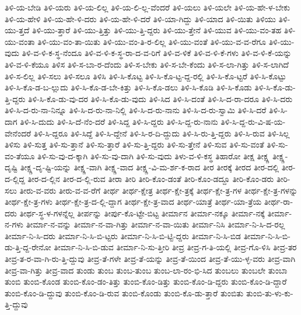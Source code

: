 {ತಿಳಿ-ಯ-ಬೇಡಿ
ತಿಳಿ-ಯರು
ತಿಳಿ-ಯ-ಲಿಲ್ಲ
ತಿಳಿ-ಯ-ಲಿ-ಲ್ಲ-ವೆಂದರೆ
ತಿಳಿ-ಯಲು
ತಿಳಿ-ಯಲೇ
ತಿಳಿ-ಯ-ಹೇ-ಳ-ಬೇಕು
ತಿಳಿ-ಯ-ಹೇಳಿ
ತಿಳಿ-ಯ-ಹೇ-ಳಿ-ದರು
ತಿಳಿ-ಯ-ಹೇ-ಳಿ-ದರೆ
ತಿಳಿ-ಯಾ-ಗಿದ್ದು
ತಿಳಿ-ಯಾದ
ತಿಳಿ-ಯಿತು
ತಿಳಿಯು
ತಿಳಿ-ಯು-ತ್ತದೆ
ತಿಳಿ-ಯು-ತ್ತಾರೆ
ತಿಳಿ-ಯು-ತ್ತಿತ್ತು
ತಿಳಿ-ಯು-ತ್ತಿ-ದ್ದರು
ತಿಳಿ-ಯು-ತ್ತೇನೆ
ತಿಳಿ-ಯುವ
ತಿಳಿ-ಯು-ವಂ-ತಹ
ತಿಳಿ-ಯು-ವಂತಾ
ತಿಳಿ-ಯು-ವಂ-ತಾ-ಯಿತು
ತಿಳಿ-ಯು-ವಂ-ತಿ-ರ-ಲಿಲ್ಲ
ತಿಳಿ-ಯು-ವಂತೆ
ತಿಳಿ-ಯು-ವ-ವ-ರೆಗೂ
ತಿಳಿ-ಯು-ವುದು
ತಿಳಿ-ವ-ಳಿ-ಕ-ಸ್ಥ-ನೆಂದೂ
ತಿಳಿ-ವ-ಳಿ-ಕ-ಸ್ಥ-ರಾ-ದ-ವ-ರಿಗೆ
ತಿಳಿ-ವ-ಳಿಕೆ
ತಿಳಿ-ವ-ಳಿ-ಕೆ-ಗಳು
ತಿಳಿ-ವ-ಳಿ-ಕೆ-ಯನ್ನು
ತಿಳಿ-ವ-ಳಿ-ಕೆಯೂ
ತಿಳಿಸ
ತಿಳಿ-ಸ-ಬಾ-ರ-ದೆಂದು
ತಿಳಿ-ಸ-ಬೇಕು
ತಿಳಿ-ಸ-ಬೇ-ಕೆಂದು
ತಿಳಿ-ಸ-ಲಾ-ಗಿತ್ತು
ತಿಳಿ-ಸ-ಲಾಗಿದೆ
ತಿಳಿ-ಸ-ಲಿಲ್ಲ
ತಿಳಿ-ಸಲು
ತಿಳಿ-ಸಲೂ
ತಿಳಿಸಿ
ತಿಳಿ-ಸಿ-ಕೊಟ್ಟ
ತಿಳಿ-ಸಿ-ಕೊ-ಟ್ಟ-ದ್ದ-ರಲ್ಲಿ
ತಿಳಿ-ಸಿ-ಕೊ-ಟ್ಟರೆ
ತಿಳಿ-ಸಿ-ಕೊಟ್ಟು
ತಿಳಿ-ಸಿ-ಕೊ-ಡ-ಬ-ಲ್ಲುದು
ತಿಳಿ-ಸಿ-ಕೊ-ಡ-ಬೇ-ಕಿತ್ತು
ತಿಳಿ-ಸಿ-ಕೊ-ಡಲು
ತಿಳಿ-ಸಿ-ಕೊಡಿ
ತಿಳಿ-ಸಿ-ಕೊಡು
ತಿಳಿ-ಸಿ-ಕೊ-ಡು-ತ್ತಿ-ದ್ದರು
ತಿಳಿ-ಸಿ-ಕೊ-ಡು-ವು-ದರ
ತಿಳಿ-ಸಿ-ಕೊ-ಡು-ವುದು
ತಿಳಿ-ಸಿದ
ತಿಳಿ-ಸಿ-ದಂತೆ
ತಿಳಿ-ಸಿ-ದ-ರಾ-ದರೂ
ತಿಳಿ-ಸಿ-ದರು
ತಿಳಿ-ಸಿ-ದ-ರು-ನಾ-ನಿನ್ನೂ
ತಿಳಿ-ಸಿ-ದ-ರು-ನಾ-ನಿಲ್ಲಿ
ತಿಳಿ-ಸಿ-ದ-ರು-ನಾನು
ತಿಳಿ-ಸಿ-ದ-ರು-ಸ್ವಾಮಿ
ತಿಳಿ-ಸಿ-ದರೆ
ತಿಳಿ-ಸಿ-ದಾಗ
ತಿಳಿ-ಸಿ-ದುದು
ತಿಳಿ-ಸಿ-ದೆ-ನೆಂ-ದರೆ
ತಿಳಿ-ಸಿದ್ದ
ತಿಳಿ-ಸಿ-ದ್ದರು
ತಿಳಿ-ಸಿ-ದ್ದ-ರು-ನಾನು
ತಿಳಿ-ಸಿ-ದ್ದ-ರು-ವಿ-ಷ-ಯ-ವೇನೆಂದರೆ
ತಿಳಿ-ಸಿ-ದ್ದರೂ
ತಿಳಿ-ಸಿದ್ದೆ
ತಿಳಿ-ಸಿ-ದ್ದೇನೆ
ತಿಳಿ-ಸಿ-ರ-ದಿ-ದ್ದುದು
ತಿಳಿ-ಸಿ-ರು-ತ್ತಿ-ದ್ದರು
ತಿಳಿ-ಸಿ-ರುವ
ತಿಳಿ-ಸಿಲ್ಲ
ತಿಳಿಸು
ತಿಳಿ-ಸುತ್ತ
ತಿಳಿ-ಸು-ತ್ತಾನೆ
ತಿಳಿ-ಸು-ತ್ತಾರೆ
ತಿಳಿ-ಸು-ತ್ತಿ-ದ್ದರು
ತಿಳಿ-ಸು-ತ್ತೇನೆ
ತಿಳಿ-ಸುವ
ತಿಳಿ-ಸು-ವಂತೆ
ತಿಳಿ-ಸು-ವಂ-ತೆಯೂ
ತಿಳಿ-ಸು-ವು-ದ-ಕ್ಕಾಗಿ
ತಿಳಿ-ಸು-ವು-ದಾಗಿ
ತಿಳಿ-ಸು-ವುದು
ತಿಳು-ವ-ಳಿ-ಕಸ್ಥ
ತಿಹಾರೋ
ತೀಕ್ಷ
ತೀಕ್ಷ್ಣ
ತೀಕ್ಷ್ಣ-ದೃಷ್ಟಿ
ತೀಕ್ಷ್ಣ-ದೃ-ಷ್ಟಿ-ಯನ್ನು
ತೀಕ್ಷ್ಣ-ವಾಗಿ
ತೀಕ್ಷ್ಣ-ವಾದ
ತೀಕ್ಷ್ಣ-ವಿ-ಮ-ರ್ಶ-ಕ-ರಾದ
ತೀರ
ತೀರಕ್ಕೆ
ತೀರದ
ತೀರ-ದಲ್ಲಿ
ತೀರ-ದ-ಲ್ಲಿದ್ದ
ತೀರ-ದ-ಲ್ಲಿನ
ತೀರ-ದ-ಲ್ಲಿ-ರುವ
ತೀರಾ
ತೀರಿ
ತೀರಿ-ಕೊಂ-ಡಂತೆ
ತೀರಿ-ಕೊಂ-ಡದ್ದೂ
ತೀರಿ-ಕೊಂ-ಡರು
ತೀರಿ-ಸಲು
ತೀರು-ವ-ವರು
ತೀರು-ವ-ವ-ರೆಗೆ
ತೀರ್ಥ
ತೀರ್ಥ-ಕ್ಷೇತ್ರ
ತೀರ್ಥ-ಕ್ಷೇ-ತ್ರಕ್ಕೆ
ತೀರ್ಥ-ಕ್ಷೇ-ತ್ರ-ಗಳ
ತೀರ್ಥ-ಕ್ಷೇ-ತ್ರ-ಗಳನ್ನು
ತೀರ್ಥ-ಕ್ಷೇ-ತ್ರ-ಗಳು
ತೀರ್ಥ-ಕ್ಷೇ-ತ್ರ-ದ-ಲ್ಲಿ-ದ್ದಾಗ
ತೀರ್ಥ-ಕ್ಷೇ-ತ್ರ-ವಾದ
ತೀರ್ಥ-ಯಾತ್ರೆ
ತೀರ್ಥ-ಯಾ-ತ್ರೆಯ
ತೀರ್ಥ-ರಾ-ದರು
ತೀರ್ಥ-ಸ್ಥ-ಳ-ಗಳನ್ನೆಲ್ಲ
ತೀರ್ಪನ್ನು
ತೀರ್ಪು-ಕೊ-ಟ್ಟೇ-ಬಿಟ್ಟ
ತೀರ್ಮಾನ
ತೀರ್ಮಾ-ನಕ್ಕೂ
ತೀರ್ಮಾ-ನಕ್ಕೆ
ತೀರ್ಮಾ-ನ-ಗಳು
ತೀರ್ಮಾ-ನ-ವನ್ನು
ತೀರ್ಮಾ-ನ-ವಾ-ಗಿತ್ತು
ತೀರ್ಮಾ-ನ-ವಾ-ಯಿತು
ತೀರ್ಮಾ-ನಿಸಿ
ತೀರ್ಮಾ-ನಿ-ಸಿ-ದ-ರಲ್ಲ
ತೀರ್ಮಾ-ನಿ-ಸಿ-ದರು
ತೀರ್ಮಾ-ನಿ-ಸಿ-ಬಿ-ಟ್ಟರು
ತೀರ್ಮಾ-ನಿ-ಸಿ-ಬಿ-ಟ್ಟಿ-ದ್ದರು
ತೀರ್ಮಾ-ನಿ-ಸಿ-ಬಿಡ
ತೀರ್ಮಾ-ನಿ-ಸಿ-ಬಿ-ಡು-ತ್ತಿ-ದ್ದ-ರೇನೋ
ತೀರ್ಮಾ-ನಿ-ಸಿ-ಬಿ-ಡುವ
ತೀರ್ಮಾ-ನಿ-ಸು-ತ್ತೀರಿ
ತೀವ್ರ
ತೀವ್ರ-ಗ-ತಿ-ಯಲ್ಲಿ
ತೀವ್ರ-ಗೊ-ಳಿಸಿ
ತೀವ್ರ-ತರ
ತೀವ್ರ-ತ-ರ-ವಾ-ಗಿ-ರು-ತ್ತಿ-ದ್ದುವು
ತೀವ್ರ-ತೆ-ಗಳೇ
ತೀವ್ರ-ತೆ-ಯನ್ನು
ತೀವ್ರ-ತೆ-ಯಿಂದ
ತೀವ್ರ-ತೆ-ಯು-ಳ್ಳ-ವರು
ತೀವ್ರ-ವಾಗಿ
ತೀವ್ರ-ವಾ-ಗಿತ್ತು
ತೀವ್ರ-ವಾದ
ತುಂಡು
ತುಂಬ
ತುಂಬ-ತುಂಬ
ತುಂಬ-ಲಾ-ರಂ-ಭಿ-ಸಿದ
ತುಂಬಲು
ತುಂಬಲೇ
ತುಂಬಾ
ತುಂಬಿ
ತುಂಬಿ-ಕೊಂಡ
ತುಂಬಿ-ಕೊಂ-ಡಂ-ತಿತ್ತು
ತುಂಬಿ-ಕೊಂ-ಡಿತ್ತು
ತುಂಬಿ-ಕೊಂ-ಡಿ-ದ್ದರು
ತುಂಬಿ-ಕೊಂ-ಡಿ-ದ್ದಾರೆ
ತುಂಬಿ-ಕೊಂ-ಡಿ-ದ್ದುವು
ತುಂಬಿ-ಕೊಂ-ಡಿ-ರುವ
ತುಂಬಿ-ಕೊಂಡು
ತುಂಬಿ-ಕೊ-ಡು-ತ್ತಾರೆ
ತುಂಬಿತು
ತುಂಬಿ-ತು-ಳು-ಕು-ತ್ತಿ-ದ್ದುವು
}
